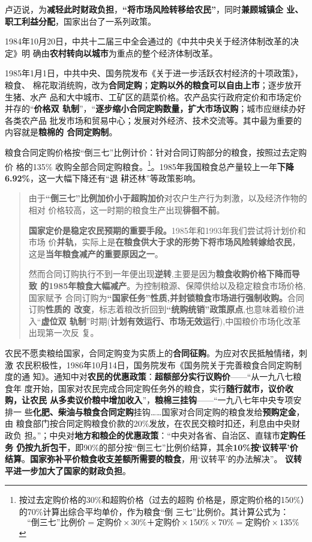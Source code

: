 卢迈说，为\textbf{减轻此时财政负担}，\textbf{“将市场风险转移给农民”}，同时\textbf{兼顾城镇企
  业、职工利益分配}，国家出台了一系列政策。

1984年10月20日，中共十二届三中全会通过的《中共中央关于经济体制改革的决定》明
确由\textbf{农村转向以城市}为重点的整个经济体制改革。

1985年1月1日，中共中央、国务院发布《关于进一步活跃农村经济的十项政策》，粮食、
棉花取消统购，改为\textbf{合同定购}；\textbf{定购以外的粮食可以自由上市}；逐步放开生猪、水产
品和大中城市、工矿区的蔬菜价格。农产品实行政府定价和市场定价并存的“\textbf{价格双
  轨制}”，“\textbf{逐步缩小合同定购数量，扩大市场议购}；城市应继续办好各类农产品
批发市场和贸易中心；发展对外经济、技术交流等。其中最为重要的内容就是\textbf{粮棉的
  合同定购制}。

粮食合同定购价格按“倒三七”比例计价：针对合同订购部分的粮食，按照过去定购价
格的135\% 收购全部合同定购粮食。\footnote{按过去定购价格的30\%和超购价格（过去的超购
  价格是，原定购价格的150\%）的70\%计算出综合平均单价，作为粮食“倒
  三七”比例价。其计算公式为：
  \[ “倒三七”比例价 = 定购价 \times 30\% ＋ 定购价 \times 150\% \times 70\% =定购价 \times
    135\%\]}。1985年我国粮食总产量较上一年\textbf{下降6.92\%}，这一大幅下降还有“退
耕还林”等政策影响。

\begin{quotation}
  由于\textbf{“倒三七”比例加价小于超购加价}对农户生产行为刺激，以及经济作物的相对
  价格较高，这一时期的粮食生产出现\textbf{徘徊不前}。\cite{shuangguizhi}

  \textbf{国家定价是稳定农民预期的重要手段。}1985年和1993年我们尝试将计划价和市场
  价\textbf{并轨}，实际上是\textbf{在粮食供大于求的形势下将市场风险转嫁给农民}，
  这是\textbf{当年粮食减产的重要原因之一}。\cite{lumaisg}

  然而合同订购执行不到一年便出现\textbf{逆转},主要是因为\textbf{粮食收购价格下降而导致
    的1985年粮食大幅减产}。为控制粮源、保障供给以及稳定粮食市场价格,国家赋予
  合同订购为\textbf{“国家任务”性质,并封锁粮食市场进行强制收购。}合同订购\textbf{性质的
    改变}，标志着粮改折回到\textbf{“统购统销”政策原点},也意味着粮价进入“\textbf{虚位双
    轨制}”时期(\textbf{计划有效运行、市场无效运行}),中国粮价市场化改革出现第一次反
  复。\cite{liangshi40}
\end{quotation}

农民不愿卖粮给国家，合同定购变为实质上的\textbf{合同征购}。为应对农民抵触情绪，刺激
农民积极性，1986年10月14日，国务院发布《国务院关于完善粮食合同定购制度的通
知》。通知中对\textbf{农民的优惠政策}：\textbf{超额部分实行议购价}——“从一九八七粮食年
度开始，国家对农民完成合同定购任务外的粮食，实行\textbf{随行就市，议价收购，让农民
  从多卖议价粮中增加收入}”，\textbf{粮棉三挂钩}——“一九八七年中央专项安排一
些\textbf{化肥、柴油与粮食合同定购}挂钩……国家对合同定购的粮食发给\textbf{预购定金}，由
粮食部门按合同定购粮食价款的20\%发放，在农民交粮时扣还，利息由中央财政负
担。”；中央对\textbf{地方和粮企的优惠政策}：“中央对各省、自治区、直辖市\textbf{定购任务
  仍按九折包干}，即90\%的部分按“倒三七”比例价结算，其余\textbf{10\%按‘议转平’价
  结算}。\textbf{国家弥补平价粮食收支差额所需要的粮食}，用‘议转平’的办法解决”。
\textbf{议转平进一步加大了国家的财政负担}。


